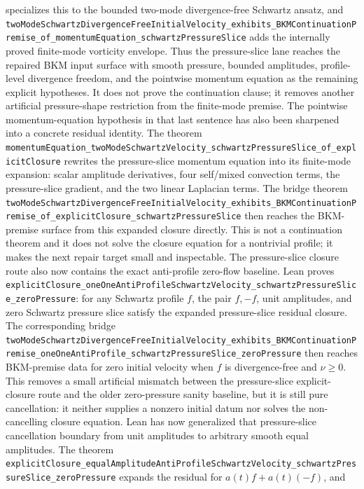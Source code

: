 \documentclass[11pt]{article}
\begin{document}
specializes this to the bounded two-mode divergence-free Schwartz ansatz, and
\texttt{twoModeSchwartzDivergenceFreeInitialVelocity\_exhibits\_BKMContinuationPremise\_of\_momentumEquation\_schwartzPressureSlice}
adds the internally proved finite-mode vorticity envelope.  Thus the
pressure-slice lane reaches the repaired BKM input surface with smooth pressure,
bounded amplitudes, profile-level divergence freedom, and the pointwise
momentum equation as the remaining explicit hypotheses.  It does not prove the
continuation clause; it removes another artificial pressure-shape restriction
from the finite-mode premise.
The pointwise momentum-equation hypothesis in that last sentence has also been
sharpened into a concrete residual identity.  The theorem
\texttt{momentumEquation\_twoModeSchwartzVelocity\_schwartzPressureSlice\_of\_explicitClosure}
rewrites the pressure-slice momentum equation into its finite-mode expansion:
scalar amplitude derivatives, four self/mixed convection terms, the
pressure-slice gradient, and the two linear Laplacian terms.  The bridge theorem
\texttt{twoModeSchwartzDivergenceFreeInitialVelocity\_exhibits\_BKMContinuationPremise\_of\_explicitClosure\_schwartzPressureSlice}
then reaches the BKM-premise surface from this expanded closure directly.  This
is not a continuation theorem and it does not solve the closure equation for a
nontrivial profile; it makes the next repair target small and inspectable.
The pressure-slice closure route also now contains the exact anti-profile
zero-flow baseline.  Lean proves
\texttt{explicitClosure\_oneOneAntiProfileSchwartzVelocity\_schwartzPressureSlice\_zeroPressure}:
for any Schwartz profile \(f\), the pair \(f,-f\), unit amplitudes, and zero
Schwartz pressure slice satisfy the expanded pressure-slice residual closure.
The corresponding bridge
\texttt{twoModeSchwartzDivergenceFreeInitialVelocity\_exhibits\_BKMContinuationPremise\_oneOneAntiProfile\_schwartzPressureSlice\_zeroPressure}
then reaches BKM-premise data for zero initial velocity when \(f\) is
divergence-free and \(\nu\ge 0\).  This removes a small artificial mismatch
between the pressure-slice explicit-closure route and the older zero-pressure
sanity baseline, but it is still pure cancellation: it neither supplies a
nonzero initial datum nor solves the non-cancelling closure equation.
Lean has now generalized that pressure-slice cancellation boundary from unit
amplitudes to arbitrary smooth equal amplitudes.  The theorem
\texttt{explicitClosure\_equalAmplitudeAntiProfileSchwartzVelocity\_schwartzPressureSlice\_zeroPressure}
expands the residual for \(a(t)f+a(t)(-f)\), and
\end{document}
